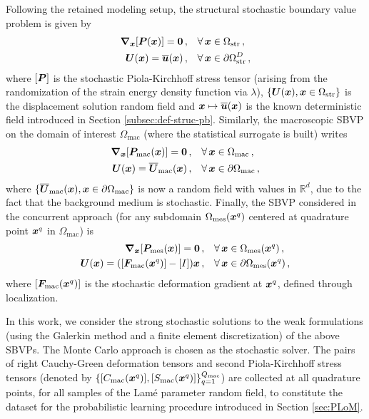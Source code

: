 Following the retained modeling setup, the structural stochastic boundary value problem is given by
\begin{align}
    \boldsymbol{\nabla}_{{\boldsymbol{x}}} [{\boldsymbol{P}}({\boldsymbol{x}})]  = \mathbf{0}\,,& \quad \forall\,{\boldsymbol{x}} \in \Omega_\text{str}\,,\\
    {\boldsymbol{U}}({\boldsymbol{x}}) = \overline{{\boldsymbol{u}}}({\boldsymbol{x}})\,,& \quad \forall\, {\boldsymbol{x}} \in \partial \Omega_\text{str}^D\,,\label{eq: structural-sto-bc}
\end{align}
where $[{\boldsymbol{P}}]$ is the stochastic Piola-Kirchhoff stress tensor (arising from the randomization of the strain energy density function via $\lambda$), $\{{\boldsymbol{U}}({\boldsymbol{x}}),{\boldsymbol{x}}\in \Omega_\text{str}\}$ is the displacement solution random field and ${\boldsymbol{x}} \mapsto \overline{{\boldsymbol{u}}}({\boldsymbol{x}})$ is the known deterministic field introduced in Section \ref{subsec:def-struc-pb}. Similarly, the macroscopic SBVP on the domain of interest $\Omega_\text{mac}$ (where the statistical surrogate is built) writes
\begin{align}
    \boldsymbol{\nabla}_{{\boldsymbol{x}}} [{\boldsymbol{P}}_\text{mac}({\boldsymbol{x}})] = {\mathbf{0}}\,,& \quad \forall\,{\boldsymbol{x}} \in \Omega_\text{mac}\,,\\
    {\boldsymbol{U}}({\boldsymbol{x}}) = \overline{{\boldsymbol{U}}}_{\text{mac}}({\boldsymbol{x}})\,,& \quad \forall\, {\boldsymbol{x}} \in \partial \Omega_\text{mac}\,,
\end{align}
where $\{\overline{{\boldsymbol{U}}}_{\text{mac}}({\boldsymbol{x}}), {\boldsymbol{x}} \in \partial \Omega_\text{mac}\}$ is now a random field with values in $\mathbb{R}^d$, due to the fact that the background medium is stochastic. Finally, the SBVP considered in the concurrent approach (for any subdomain $\Omega_\text{mes}({\boldsymbol{x}}^{q})$ centered at quadrature point ${\boldsymbol{x}}^{q}$ in $\Omega_\text{mac}$) is
\begin{align}
    \boldsymbol{\nabla}_{{\boldsymbol{x}}} [{\boldsymbol{P}}_\text{mes}({\boldsymbol{x}})] = {\mathbf{0}}\,,& \quad \forall\,{\boldsymbol{x}} \in \Omega_\text{mes}({\boldsymbol{x}}^{q})\,,\\
    {\boldsymbol{U}}({\boldsymbol{x}}) = ([{\boldsymbol{F}}_\text{mac}({\boldsymbol{x}}^{q})] - [I]) {\boldsymbol{x}} \,,& \quad \forall\, {\boldsymbol{x}} \in \partial \Omega_\text{mes}({\boldsymbol{x}}^{q})\,,
\end{align}
where $[{\boldsymbol{F}}_\text{mac}({\boldsymbol{x}}^{q})]$ is the stochastic deformation gradient at ${\boldsymbol{x}}^{q}$, defined through localization.

In this work, we consider the strong stochastic solutions to the weak formulations (using the Galerkin method and a finite element discretization) of the above SBVPs. The Monte Carlo approach is chosen as the stochastic solver. The pairs of right Cauchy-Green deformation tensors and second Piola-Kirchhoff stress tensors (denoted by $\{[C_\text{mac}({\boldsymbol{x}}^{q})],[S_\text{mac}({\boldsymbol{x}}^{q})]\}_{q = 1}^{Q_\text{mac}}$) are collected at all quadrature points, for all samples of the Lam\'e parameter random field, to constitute the dataset for the probabilistic learning procedure introduced in Section \ref{sec:PLoM}.

